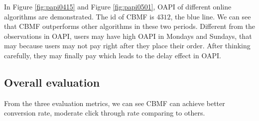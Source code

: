 In Figure \ref{fig:papi0415} and Figure \ref{fig:papi0501}, OAPI of different online algorithms are demonstrated. The id of CBMF is $4312$, the blue line. We can see that CBMF outperforms other algorithms in these two periods. Different from the observations in OAPI, users may have high OAPI in Mondays and Sundays, that may because users may not pay right after they place their order. After thinking carefully, they may finally pay which leads to the delay effect in OAPI.

\subsection*{Overall evaluation}
From the three evaluation metrics, we can see CBMF can achieve better conversion rate, moderate click through rate comparing to others. 




